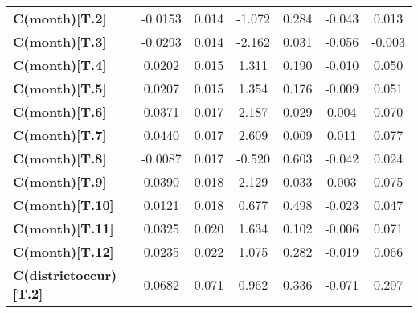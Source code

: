 \begin{center}
\begin{tabular}{lcccccc}
\textbf{C(month)[T.2]}                                                            &      -0.0153  &        0.014     &    -1.072  &         0.284        &       -0.043    &        0.013     \\
\textbf{C(month)[T.3]}                                                            &      -0.0293  &        0.014     &    -2.162  &         0.031        &       -0.056    &       -0.003     \\
\textbf{C(month)[T.4]}                                                            &       0.0202  &        0.015     &     1.311  &         0.190        &       -0.010    &        0.050     \\
\textbf{C(month)[T.5]}                                                            &       0.0207  &        0.015     &     1.354  &         0.176        &       -0.009    &        0.051     \\
\textbf{C(month)[T.6]}                                                            &       0.0371  &        0.017     &     2.187  &         0.029        &        0.004    &        0.070     \\
\textbf{C(month)[T.7]}                                                            &       0.0440  &        0.017     &     2.609  &         0.009        &        0.011    &        0.077     \\
\textbf{C(month)[T.8]}                                                            &      -0.0087  &        0.017     &    -0.520  &         0.603        &       -0.042    &        0.024     \\
\textbf{C(month)[T.9]}                                                            &       0.0390  &        0.018     &     2.129  &         0.033        &        0.003    &        0.075     \\
\textbf{C(month)[T.10]}                                                           &       0.0121  &        0.018     &     0.677  &         0.498        &       -0.023    &        0.047     \\
\textbf{C(month)[T.11]}                                                           &       0.0325  &        0.020     &     1.634  &         0.102        &       -0.006    &        0.071     \\
\textbf{C(month)[T.12]}                                                           &       0.0235  &        0.022     &     1.075  &         0.282        &       -0.019    &        0.066     \\
\textbf{C(districtoccur)[T.2]}                                                    &       0.0682  &        0.071     &     0.962  &         0.336        &       -0.071    &        0.207     \\

\end{tabular}
\end{center}
